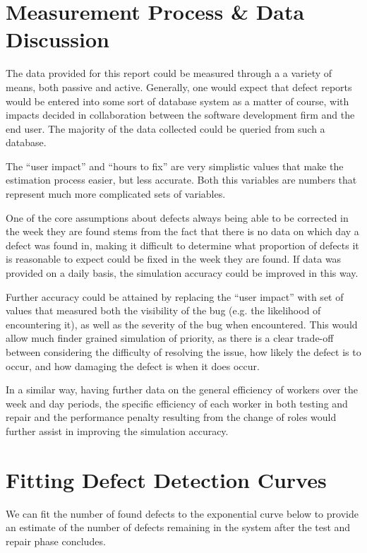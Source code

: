 \documentclass[a4paper,10pt]{article}
\begin{document}
\section{Measurement Process \& Data Discussion}
The data provided for this report could be measured through a a variety of means, both passive and active. Generally, one would expect that defect reports would be entered into some sort of database system as a matter of course, with impacts decided in collaboration between the software development firm and the end user. The majority of the data collected could be queried from such a database.

The ``user impact'' and ``hours to fix'' are very simplistic values that make the estimation process easier, but less accurate. Both this variables are numbers that represent much more complicated sets of variables.

One of the core assumptions about defects always being able to be corrected in the week they are found stems from the fact that there is no data on which day a defect was found in, making it difficult to determine what proportion of defects it is reasonable to expect could be fixed in the week they are found. If data was provided on a daily basis, the simulation accuracy could be improved in this way.

Further accuracy could be attained by replacing the ``user impact'' with set of values that measured both the visibility of the bug (e.g. the likelihood of encountering it), as well as the severity of the bug when encountered. This would allow much finder grained simulation of priority, as there is a clear trade-off between considering the difficulty of resolving the issue, how likely the defect is to occur, and how damaging the defect is when it does occur.

In a similar way, having further data on the general efficiency of workers over the week and day periods, the specific efficiency of each worker in both testing and repair and the performance penalty resulting from the change of roles would further assist in improving the simulation accuracy.

\section{Fitting Defect Detection Curves}
We can fit the number of found defects to the exponential curve below to provide an estimate of the number of defects remaining in the system after the test and repair phase concludes.
\end{document}
